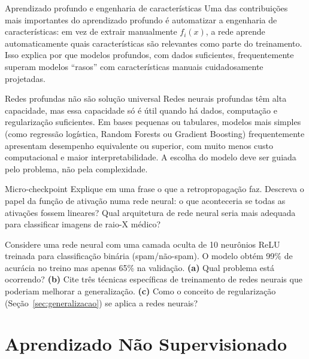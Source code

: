 \documentclass[12pt,a4paper]{article}
\begin{document}
\begin{notabox}{Aprendizado profundo e engenharia de características}
Uma das contribuições mais importantes do aprendizado profundo é automatizar a engenharia de características: em vez de extrair manualmente $f_i(x)$, a rede aprende automaticamente quais características são relevantes como parte do treinamento. Isso explica por que modelos profundos, com dados suficientes, frequentemente superam modelos ``rasos'' com características manuais cuidadosamente projetadas.
\end{notabox}

\begin{alertabox}{Redes profundas não são solução universal}
Redes neurais profundas têm alta capacidade, mas essa capacidade só é útil quando há dados, computação e regularização suficientes. Em bases pequenas ou tabulares, modelos mais simples (como regressão logística, Random Forests ou Gradient Boosting) frequentemente apresentam desempenho equivalente ou superior, com muito menos custo computacional e maior interpretabilidade. A escolha do modelo deve ser guiada pelo problema, não pela complexidade.
\end{alertabox}

\begin{checkpointbox}{Micro-checkpoint}
Explique em uma frase o que a retropropagação faz. Descreva o papel da função de ativação numa rede neural: o que aconteceria se todas as ativações fossem lineares? Qual arquitetura de rede neural seria mais adequada para classificar imagens de raio-X médico?
\end{checkpointbox}

\begin{perguntabox}
Considere uma rede neural com uma camada oculta de 10 neurônios ReLU treinada para classificação binária (spam/não-spam). O modelo obtém 99\% de acurácia no treino mas apenas 65\% na validação. \textbf{(a)} Qual problema está ocorrendo? \textbf{(b)} Cite três técnicas específicas de treinamento de redes neurais que poderiam melhorar a generalização. \textbf{(c)} Como o conceito de regularização (Seção~\ref{sec:generalizacao}) se aplica a redes neurais?
\end{perguntabox}

\section{Aprendizado Não Supervisionado}
\label{sec:nao-supervisionado}
\end{document}
